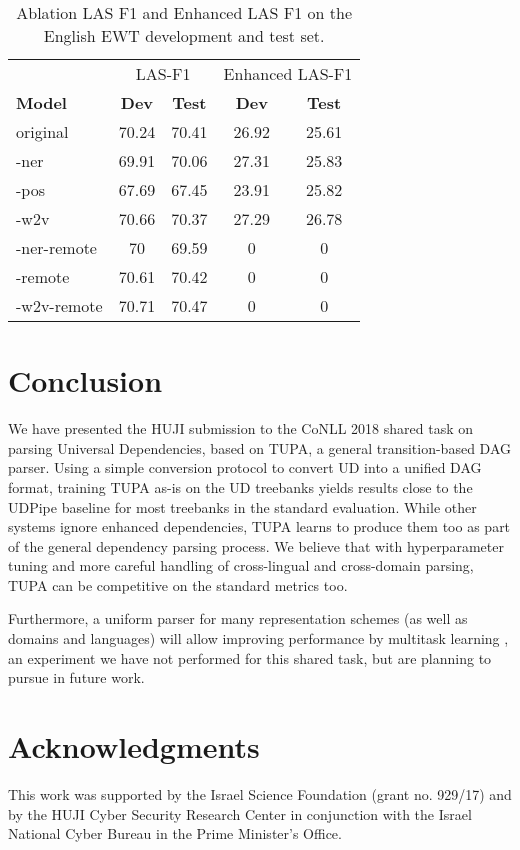 \documentclass[11pt,a4paper]{article}
\begin{document}
\begin{table}[t]
\begin{tabular}{l|cc|cc}
\hline
& \multicolumn{2}{c|}{\small LAS-F1} & \multicolumn{2}{c}{\small Enhanced LAS-F1} \\
\bf Model & \bf Dev & \bf Test & \bf Dev & \bf Test \\
\hline
original & 70.24 & 70.41 & 26.92 & 25.61 \\ 
-ner & 69.91 & 70.06 & 27.31 & 25.83 \\ 
-pos & 67.69 & 67.45 & 23.91 & 25.82 \\ 
-w2v & 70.66 & 70.37 & 27.29 & 26.78 \\ 
-ner-remote & 70 & 69.59 & 0 & 0 \\ 
-remote & 70.61 & 70.42 & 0 & 0 \\ 
-w2v-remote & 70.71 & 70.47 & 0 & 0
\end{tabular}
\caption{Ablation LAS F1 and Enhanced LAS F1 on the English EWT development and test set.
\label{tab:ablation}}
\end{table}

\section{Conclusion}\label{sec:conclusion}

We have presented the HUJI submission to the CoNLL 2018 shared task on parsing Universal Dependencies, based on TUPA, a general transition-based DAG parser.
Using a simple conversion protocol to convert UD into a unified DAG format,
training TUPA as-is on the UD treebanks yields results
close to the UDPipe baseline for most treebanks in the standard evaluation.
While other systems ignore enhanced dependencies,
TUPA learns to produce them too as part of the general dependency parsing process.
We believe that with hyperparameter tuning and more careful handling of
cross-lingual and cross-domain parsing, TUPA can be competitive on the standard metrics too.

Furthermore, a uniform parser for many representation schemes (as well as domains and languages)
will allow improving performance by multitask learning \cite{hershcovich2018multitask},
an experiment we have not performed for this shared task, but are planning to pursue in future work.


\section*{Acknowledgments}

This work was supported by the Israel Science Foundation (grant no. 929/17) and
by the HUJI Cyber Security Research Center
in conjunction with the Israel National Cyber Bureau in the Prime Minister's Office.





\end{document}
